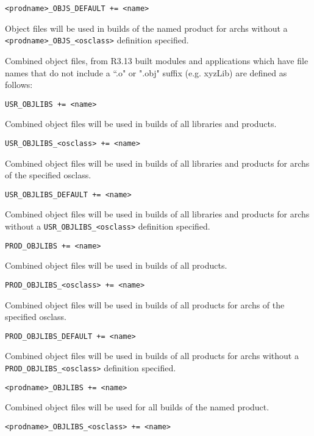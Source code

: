 \begin{description}
\item \verb|<prodname>_OBJS_DEFAULT += <name>|

Object files will be used in builds of the named product for archs without a \verb|<prodname>_OBJS_<osclass>| 
definition specified.

Combined object files, from R3.13 built modules and applications which have file names that do not include a ``.o" or 
".obj" suffix (e.g. xyzLib) are defined as follows:

\item {}\verb|USR_OBJLIBS += <name>|

Combined object files will be used in builds of all libraries and products.

\item \verb|USR_OBJLIBS_<osclass> += <name>|

Combined object files will be used in builds of all libraries and products for archs of the specified osclass.

\item \verb|USR_OBJLIBS_DEFAULT += <name>|

Combined object files will be used in builds of all libraries and products for archs without a 
\verb|USR_OBJLIBS_<osclass>| definition specified.

\item

\item {}\verb|PROD_OBJLIBS += <name>|

Combined object files will be used in builds of all products.

\item \verb|PROD_OBJLIBS_<osclass> += <name>|

Combined object files will be used in builds of all products for archs of the specified osclass.

\item \verb|PROD_OBJLIBS_DEFAULT += <name>|

Combined object files will be used in builds of all products for archs without a \verb|PROD_OBJLIBS_<osclass>| 
definition specified.

\item

\item {}\verb|<prodname>_OBJLIBS += <name>|

Combined object files will be used for all builds of the named product.

\item \verb|<prodname>_OBJLIBS_<osclass> += <name>| 


\end{description}
